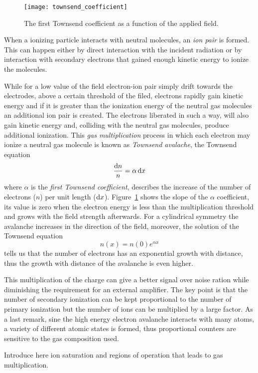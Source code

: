 \begin{figure}[!h]
  \centering
  \texttt{[image: townsend\_coefficient]}
  \caption{The first Townsend coefficient as a function of the applied field\autocite{Knoll:RadMeasurement}.}
  \label{fig:town_coeff}
\end{figure}
When a ionizing particle interacts with neutral molecules, an \emph{ion pair} is
formed. This can happen either by direct interaction with the incident radiation
or by interaction with secondary electrons that gained enough kinetic energy to
ionize the molecules.

While for a low value of the field electron-ion pair simply drift towards the
electrodes, above a certain threshold of the filed, electrons rapidly gain
kinetic energy and if it is greater than the ionization energy of the neutral
gas molecules an additional ion pair is created. The electrons liberated in such
a way, will also gain kinetic energy and, colliding with the neutral gas
molecules, produce additional ionization. This \emph{gas multiplication} process
in which each electron may ionize a neutral gas molecule is known as
\emph{Townsend avalache}, the Townsend equation
\begin{equation}
  \label{eq:townsend}
  \frac{\mathrm{d} n}{n} = \alpha\, \mathrm{d} x
\end{equation}
where $\alpha$ is the \emph{first Townsend coefficient}, describes the increase
of the number of electrons ($n$) per unit length ($\mathrm{d}
x$). Figure~\ref{fig:town_coeff} shows the slope of the $\alpha$ coefficient,
its value is zero when the electron energy is less than the multiplication
threshold and grows with the field strength afterwards. For a cylindrical
symmetry the avalanche increases in the direction of the field, moreover, the
solution of the Townsend equation
\begin{equation}
  \label{eq:townsend_sol}
  n(x) = n(0) e^{\alpha x}
\end{equation}
tells us that the number of electrons has an exponential growth with distance,
thus the growth with distance of the avalanche is even higher.

This multiplication of the charge can give a better signal over noise ration while
diminishing the requirement for an external amplifier. The key point is that the
number of secondary ionization can be kept proportional to the number of primary
ionization but the number of ions can be multiplied by a large factor. As a last
remark, sine the high energy electron avalanche interacts with many atoms, a
variety of different atomic states is formed, thus proportional counters are
sensitive to the gas composition used.

\mbox{}

Introduce here ion saturation and regions of operation that leads to gas
multiplication.


